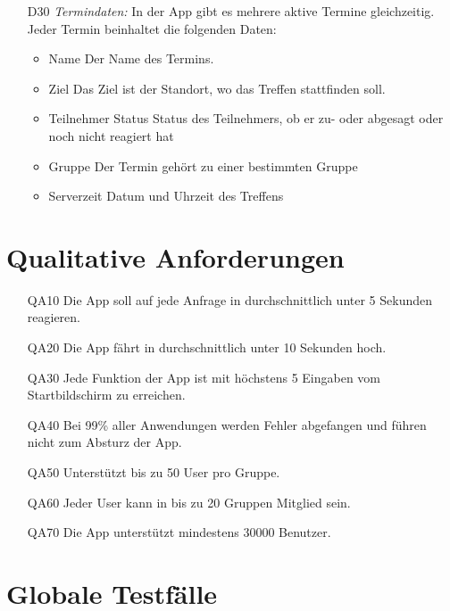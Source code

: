 \documentclass{scrartcl}
\begin{document}
\begin{itemize}
		\item [D30] \textit{Termindaten:}
		In der App gibt es mehrere aktive Termine gleichzeitig. Jeder Termin beinhaltet die folgenden Daten:
		\begin{itemize}
			\item Name
			\newline Der Name des Termins.
			\item Ziel
			\newline Das Ziel ist der Standort, wo das Treffen stattfinden soll.
			\item Teilnehmer Status
			\newline Status des Teilnehmers, ob er zu- oder abgesagt oder noch nicht reagiert hat
			\item Gruppe
			\newline Der Termin gehört zu einer bestimmten Gruppe
			\item Serverzeit
			\newline Datum und Uhrzeit des Treffens
		\end{itemize}
	\end{itemize}
	
	\newpage
	
	
	\section{Qualitative Anforderungen}
	\begin{itemize}
		\item[QA10] Die App soll auf jede Anfrage in durchschnittlich unter 5 Sekunden reagieren.
		\item[QA20] Die App fährt in durchschnittlich unter 10 Sekunden hoch.
		\item[QA30] Jede Funktion der App ist mit höchstens 5 Eingaben vom Startbildschirm zu erreichen.
		\item[QA40] Bei 99\% aller Anwendungen werden Fehler abgefangen und führen nicht zum Absturz der App.
		\item[QA50] Unterstützt bis zu 50 User pro Gruppe.
		\item[QA60] Jeder User kann in bis zu 20 Gruppen Mitglied sein.
		\item[QA70] Die App unterstützt mindestens 30000 Benutzer.
	\end{itemize}
	
	\newpage
	
	
	\section{Globale Testfälle}
\end{document}
